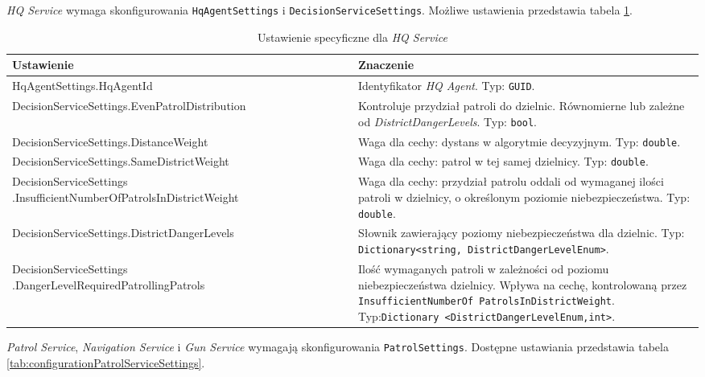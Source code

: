 \par \emph{HQ Service} wymaga skonfigurowania \texttt{HqAgentSettings} i \texttt{DecisionServiceSettings}. Możliwe ustawienia przedstawia tabela \ref{tab:configurationHqServiceSettings}.

\begin{table}[H]
    \centering
    \begin{tabular}{|p{0.5\linewidth} | p{0.5\linewidth}|} 
     \hline
     Ustawienie & Znaczenie \\
     \hline
     \hline
     HqAgentSettings.HqAgentId & Identyfikator \emph{HQ Agent}. Typ: \texttt{GUID}. \\ 
     \hline
     DecisionServiceSettings.EvenPatrolDistribution & Kontroluje przydział patroli do dzielnic. Równomierne lub zależne od \emph{DistrictDangerLevels}. Typ: \texttt{bool}. \\ 
     \hline
     DecisionServiceSettings.DistanceWeight & Waga dla cechy: dystans w algorytmie decyzyjnym. Typ: \texttt{double}. \\ 
     \hline
     DecisionServiceSettings.SameDistrictWeight & Waga dla cechy: patrol w tej samej dzielnicy. Typ: \texttt{double}. \\ 
     \hline
     \makecell[tl]{DecisionServiceSettings\\.InsufficientNumberOfPatrolsInDistrictWeight} & Waga dla cechy: przydział patrolu oddali od wymaganej ilości patroli w dzielnicy, o określonym poziomie niebezpieczeństwa. Typ: \texttt{double}. \\ 
     \hline
     DecisionServiceSettings.DistrictDangerLevels & Słownik zawierający poziomy niebezpieczeństwa dla dzielnic. Typ: \texttt{Dictionary<string, DistrictDangerLevelEnum>}. \\ 
     \hline
     \makecell[tl]{DecisionServiceSettings\\.DangerLevelRequiredPatrollingPatrols} & Ilość wymaganych patroli w zależności od poziomu niebezpieczeństwa dzielnicy. Wpływa na cechę, kontrolowaną przez \texttt{InsufficientNumberOf PatrolsInDistrictWeight}. Typ:\newline \texttt{Dictionary <DistrictDangerLevelEnum,int>}. \\ 
     \hline
    \end{tabular}
    \caption{Ustawienie specyficzne dla \emph{HQ Service}}
    \label{tab:configurationHqServiceSettings}
\end{table}

\par \emph{Patrol Service}, \emph{Navigation Service} i \emph{Gun Service} wymagają skonfigurowania \texttt{PatrolSettings}. Dostępne ustawiania przedstawia tabela \ref{tab:configurationPatrolServiceSettings}.

